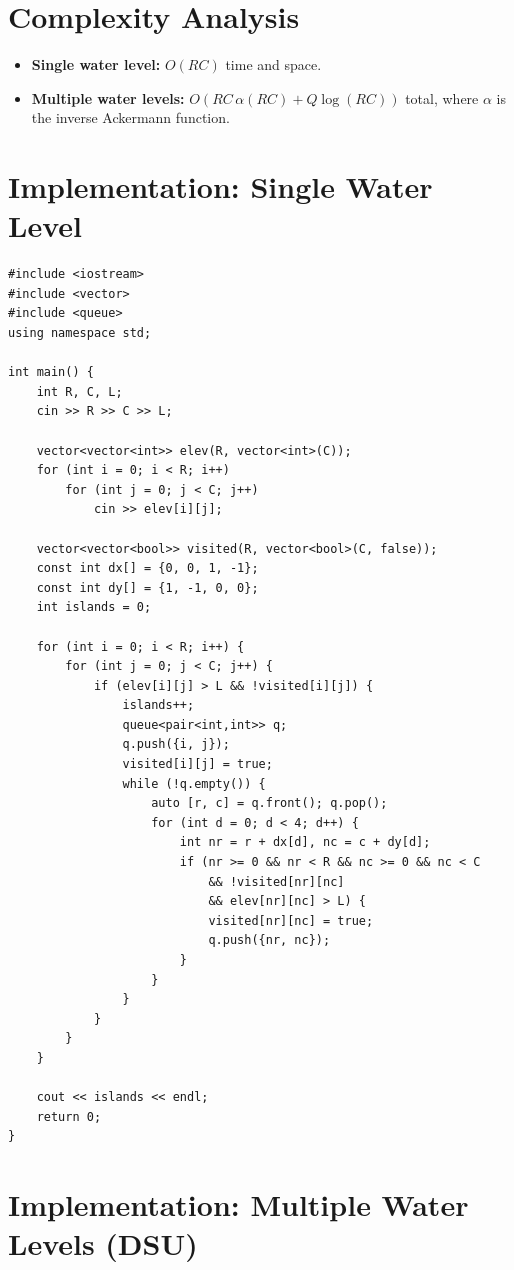 \documentclass[11pt,a4paper]{article}
\begin{document}
\section{Complexity Analysis}

\begin{itemize}
  \item \textbf{Single water level:} $O(RC)$ time and space.
  \item \textbf{Multiple water levels:} $O(RC\,\alpha(RC) + Q\log(RC))$
    total, where $\alpha$ is the inverse Ackermann function.
\end{itemize}

\section{Implementation: Single Water Level}

\begin{lstlisting}
#include <iostream>
#include <vector>
#include <queue>
using namespace std;

int main() {
    int R, C, L;
    cin >> R >> C >> L;

    vector<vector<int>> elev(R, vector<int>(C));
    for (int i = 0; i < R; i++)
        for (int j = 0; j < C; j++)
            cin >> elev[i][j];

    vector<vector<bool>> visited(R, vector<bool>(C, false));
    const int dx[] = {0, 0, 1, -1};
    const int dy[] = {1, -1, 0, 0};
    int islands = 0;

    for (int i = 0; i < R; i++) {
        for (int j = 0; j < C; j++) {
            if (elev[i][j] > L && !visited[i][j]) {
                islands++;
                queue<pair<int,int>> q;
                q.push({i, j});
                visited[i][j] = true;
                while (!q.empty()) {
                    auto [r, c] = q.front(); q.pop();
                    for (int d = 0; d < 4; d++) {
                        int nr = r + dx[d], nc = c + dy[d];
                        if (nr >= 0 && nr < R && nc >= 0 && nc < C
                            && !visited[nr][nc]
                            && elev[nr][nc] > L) {
                            visited[nr][nc] = true;
                            q.push({nr, nc});
                        }
                    }
                }
            }
        }
    }

    cout << islands << endl;
    return 0;
}
\end{lstlisting}

\section{Implementation: Multiple Water Levels (DSU)}
\end{document}
